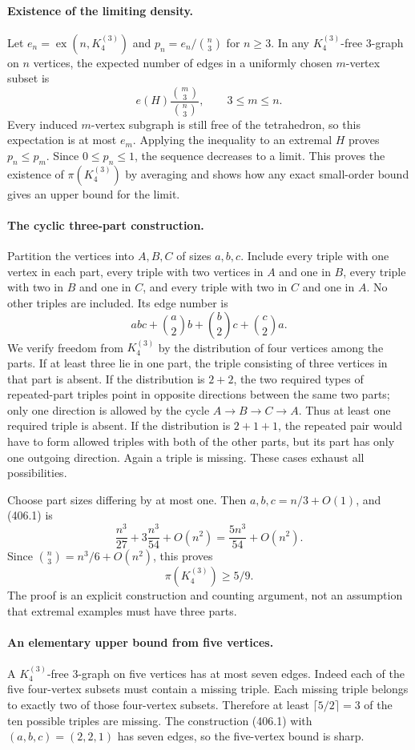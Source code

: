 \documentclass[11pt]{article}
\begin{document}
\paragraph{Existence of the limiting density.}
Let $e_n=\operatorname{ex}(n,K_4^{(3)})$ and $p_n=e_n/\binom n3$ for $n\ge3$. In any $K_4^{(3)}$-free 3-graph on $n$ vertices, the expected number of edges in a uniformly chosen $m$-vertex subset is
\[
 e(H)\frac{\binom m3}{\binom n3},\qquad 3\le m\le n.
\]
Every induced $m$-vertex subgraph is still free of the tetrahedron, so this expectation is at most $e_m$. Applying the inequality to an extremal $H$ proves $p_n\le p_m$. Since $0\le p_n\le1$, the sequence decreases to a limit. This proves the existence of $\pi(K_4^{(3)})$ by averaging and shows how any exact small-order bound gives an upper bound for the limit.

\paragraph{The cyclic three-part construction.}
Partition the vertices into $A,B,C$ of sizes $a,b,c$. Include every triple with one vertex in each part, every triple with two vertices in $A$ and one in $B$, every triple with two in $B$ and one in $C$, and every triple with two in $C$ and one in $A$. No other triples are included. Its edge number is
\[
 abc+\binom a2b+\binom b2c+\binom c2a. \tag{406.1}
\]
We verify freedom from $K_4^{(3)}$ by the distribution of four vertices among the parts. If at least three lie in one part, the triple consisting of three vertices in that part is absent. If the distribution is $2+2$, the two required types of repeated-part triples point in opposite directions between the same two parts; only one direction is allowed by the cycle $A\to B\to C\to A$. Thus at least one required triple is absent. If the distribution is $2+1+1$, the repeated pair would have to form allowed triples with both of the other parts, but its part has only one outgoing direction. Again a triple is missing. These cases exhaust all possibilities.

Choose part sizes differing by at most one. Then $a,b,c=n/3+O(1)$, and (406.1) is
\[
 \frac{n^3}{27}+3\frac{n^3}{54}+O(n^2)
 =\frac{5n^3}{54}+O(n^2).
\]
Since $\binom n3=n^3/6+O(n^2)$, this proves
\[
 \pi(K_4^{(3)})\ge5/9. \tag{406.2}
\]
The proof is an explicit construction and counting argument, not an assumption that extremal examples must have three parts.

\paragraph{An elementary upper bound from five vertices.}
A $K_4^{(3)}$-free 3-graph on five vertices has at most seven edges. Indeed each of the five four-vertex subsets must contain a missing triple. Each missing triple belongs to exactly two of those four-vertex subsets. Therefore at least $\lceil5/2\rceil=3$ of the ten possible triples are missing. The construction (406.1) with $(a,b,c)=(2,2,1)$ has seven edges, so the five-vertex bound is sharp.
\end{document}

